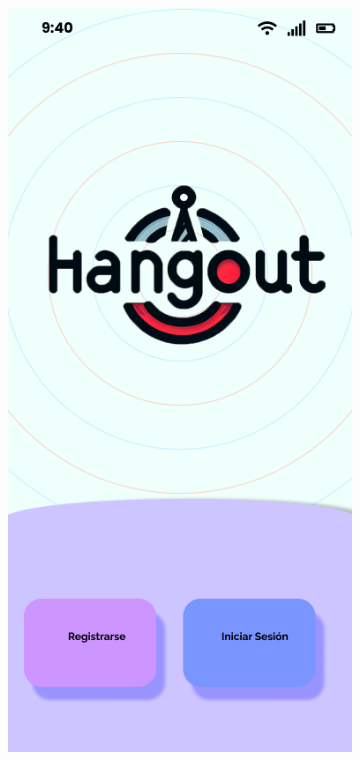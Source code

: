 \clearpage
\vspace*{\fill}
\begin{figure}[H]
    \centering
    \begin{subfigure}{0.45\textwidth}
        \centering
        \includegraphics[width=\linewidth]{imagenes/mockup1.png}

\end{subfigure}
\end{figure}
